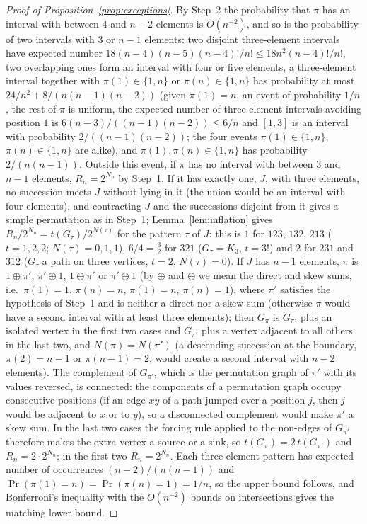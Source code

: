 \documentclass[11pt,a4paper]{article}
\theoremstyle{plain}
\theoremstyle{definition}
\theoremstyle{remark}
\begin{document}
\begin{proof}[Proof of Proposition~\ref{prop:exceptions}]
By Step~2 the probability that $\pi$ has an interval with between $4$ and $n-2$ elements is $O(n^{-2})$, and so is the probability of two intervals with $3$ or $n-1$ elements: two disjoint three-element intervals have expected number $18(n-4)(n-5)(n-4)!/n!\le18n^2(n-4)!/n!$, two overlapping ones form an interval with four or five elements, a three-element interval together with $\pi(1)\in\{1,n\}$ or $\pi(n)\in\{1,n\}$ has probability at most $24/n^2+8/(n(n-1)(n-2))$ (given $\pi(1)=n$, an event of probability $1/n$, the rest of $\pi$ is uniform, the expected number of three-element intervals avoiding position $1$ is $6(n-3)/((n-1)(n-2))\le6/n$ and $[1,3]$ is an interval with probability $2/((n-1)(n-2))$; the four events $\pi(1)\in\{1,n\}$, $\pi(n)\in\{1,n\}$ are alike), and $\pi(1),\pi(n)\in\{1,n\}$ has probability $2/(n(n-1))$. Outside this event, if $\pi$ has no interval with between $3$ and $n-1$ elements, $R_n=2^{N_n}$ by Step~1. If it has exactly one, $J$, with three elements, no succession meets $J$ without lying in it (the union would be an interval with four elements), and contracting $J$ and the successions disjoint from it gives a simple permutation as in Step~1; Lemma~\ref{lem:inflation} gives $R_n/2^{N_n}=t(G_\tau)/2^{N(\tau)}$ for the pattern $\tau$ of $J$: this is $1$ for $123$, $132$, $213$ ($t=1,2,2$; $N(\tau)=0,1,1$), $6/4=\tfrac32$ for $321$ ($G_\tau=K_3$, $t=3!$) and $2$ for $231$ and $312$ ($G_\tau$ a path on three vertices, $t=2$, $N(\tau)=0$). If $J$ has $n-1$ elements, $\pi$ is $1\oplus\pi'$, $\pi'\oplus1$, $1\ominus\pi'$ or $\pi'\ominus1$ (by $\oplus$ and $\ominus$ we mean the direct and skew sums, i.e.\ $\pi(1)=1$, $\pi(n)=n$, $\pi(1)=n$, $\pi(n)=1$), where $\pi'$ satisfies the hypothesis of Step~1 and is neither a direct nor a skew sum (otherwise $\pi$ would have a second interval with at least three elements); then $G_\pi$ is $G_{\pi'}$ plus an isolated vertex in the first two cases and $G_{\pi'}$ plus a vertex adjacent to all others in the last two, and $N(\pi)=N(\pi')$ (a descending succession at the boundary, $\pi(2)=n-1$ or $\pi(n-1)=2$, would create a second interval with $n-2$ elements). The complement of $G_{\pi'}$, which is the permutation graph of $\pi'$ with its values reversed, is connected: the components of a permutation graph occupy consecutive positions (if an edge $xy$ of a path jumped over a position $j$, then $j$ would be adjacent to $x$ or to $y$), so a disconnected complement would make $\pi'$ a skew sum. In the last two cases the forcing rule applied to the non-edges of $G_{\pi'}$ therefore makes the extra vertex a source or a sink, so $t(G_\pi)=2\,t(G_{\pi'})$ and $R_n=2\cdot2^{N_n}$; in the first two $R_n=2^{N_n}$. Each three-element pattern has expected number of occurrences $(n-2)/(n(n-1))$ and $\Pr(\pi(1)=n)=\Pr(\pi(n)=1)=1/n$, so the upper bound follows, and Bonferroni's inequality with the $O(n^{-2})$ bounds on intersections gives the matching lower bound.
\end{proof}
\end{document}
